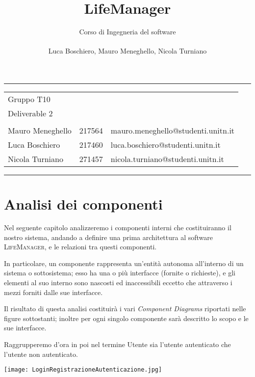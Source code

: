 \documentclass[a4paper,12pt]{article}
\title{LifeManager}
\author{
 Corso di Ingegneria del software\\ \\Luca Boschiero, Mauro Meneghello, Nicola Turniano
 }
\begin{document}
 
 \maketitle
 \thispagestyle{fancy}
 \vspace{15cm}
\hrule
\begin{table}[!h] 
\begin{tabular}{l l l}
Gruppo T10\\
Deliverable 2\\
 \\
Mauro Meneghello & 217564 & mauro.meneghello@studenti.unitn.it \\
Luca Boschiero & 217460 & luca.boschiero@studenti.unitn.it \\
Nicola Turniano  & 271457 & nicola.turniano@studenti.unitn.it \\
\end{tabular}
\end{table}
\hrule



  

\newpage


\part{Analisi dei componenti}
Nel seguente capitolo analizzeremo i componenti interni che costituiranno il nostro sistema, andando a definire una prima architettura al software {\scshape LifeManager}, e le relazioni tra questi componenti. 

In particolare, un componente rappresenta un’entità autonoma all’interno di un sistema o sottosistema; esso ha una o più interfacce (fornite o richieste), e gli elementi al suo interno sono nascosti ed inaccessibili eccetto che attraverso i mezzi forniti dalle sue interfacce.


Il risultato di questa analisi costituirà i vari \textit{Component Diagrams }riportati nelle figure sottostanti; inoltre per ogni singolo componente sarà descritto lo scopo e le sue interfacce.

Raggrupperemo d'ora in poi nel termine Utente sia l'utente autenticato che l'utente non autenticato.

\begin{center}
  \texttt{[image: LoginRegistrazioneAutenticazione.jpg]}
\end{center}
\end{document}
